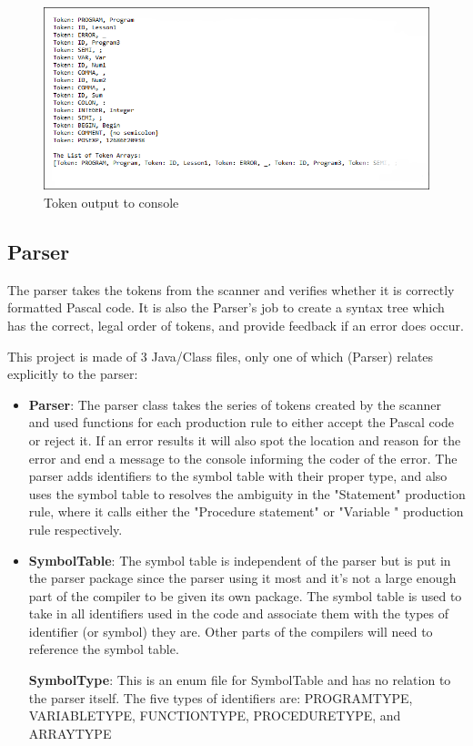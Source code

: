 \documentclass[english]{article}
\begin{document}
\begin{figure}
\begin{center}
\includegraphics[width=1.1\textwidth]{output.PNG}
\end{center}
\caption{\label{Output}Token output to console}
\end{figure}


\subsection{Parser}

The parser takes the tokens from the scanner and verifies whether it is correctly formatted Pascal code. It is also the Parser’s job to create a syntax tree which has the correct, legal order of tokens, and provide feedback if an error does occur.

This project is made of 3 Java/Class files, only one of which (Parser) relates explicitly to the parser:

\begin{itemize}

\item
\textbf{Parser}: The parser class takes the series of tokens created by the scanner and used functions for each production rule to either accept the Pascal code or reject it. If an error results it will also spot the location and reason for the error and end a message to the console informing the coder of the error. The parser adds identifiers to the symbol table with their proper type, and also uses the symbol table to resolves the ambiguity in the "Statement" production rule, where it calls either the "Procedure statement" or "Variable " production rule respectively.

\item
\textbf{SymbolTable}: The symbol table is independent of the parser but is put in the parser package since the parser using it most and it’s not a large enough part of the compiler to be given its own package. The symbol table is used to take in all identifiers used in the code and associate them with the types of identifier (or symbol) they are. Other parts of the compilers will need to reference the symbol table.

\textbf{SymbolType}: This is an enum file for SymbolTable and has no relation to the parser itself. The five types of identifiers are: PROGRAMTYPE, VARIABLETYPE, FUNCTIONTYPE, PROCEDURETYPE, and ARRAYTYPE

\end{itemize}
\end{document}

